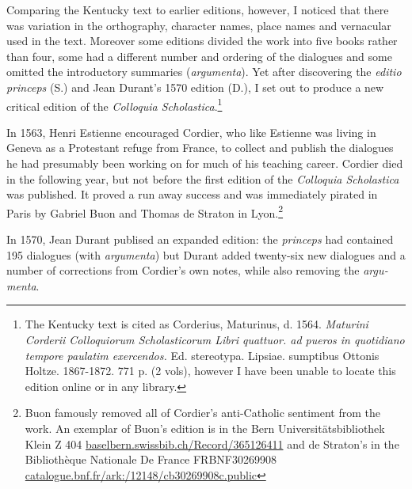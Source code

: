 \documentclass{article}
\begin{document}
\begin{english}
Comparing the Kentucky text to earlier editions, however, I noticed that there was variation in the orthography, character names, place names and vernacular used in the text. Moreover some editions divided the work into five books rather than four, some had a different number and ordering of the dialogues and some omitted the introductory summaries (\emph{argumenta}). Yet after discovering the \emph{editio princeps} (S.) and Jean Durant's 1570 edition (D.), I set out to produce a new critical edition of the \emph{Colloquia Scholastica}.\footnote{The Kentucky text is cited as Corderius, Maturinus, d. 1564. \emph{Maturini Corderii Colloquiorum Scholasticorum Libri quattuor. ad pueros in quotidiano tempore paulatim exercendos.} Ed. stereotypa. Lipsiae. sumptibus Ottonis Holtze. 1867-1872. 771 p. (2 vols), however I have been unable to locate this edition online or in any library.}

In 1563, Henri Estienne encouraged Cordier, who like Estienne was living in Geneva as a Protestant refuge from France, to collect and publish the dialogues he had presumably been working on for much of his teaching career. Cordier died in the following year, but not before the first edition of the \emph{Colloquia Scholastica} was published. It proved a run away success and was immediately pirated in Paris by Gabriel Buon and Thomas de Straton in Lyon.\footnote{Buon famously removed all of Cordier's anti-Catholic sentiment from the work. An exemplar of Buon's edition is in the Bern Universitätsbibliothek Klein Z 404 \url{baselbern.swissbib.ch/Record/365126411} and de Straton's in the Bibliothèque Nationale De France FRBNF30269908 \url{catalogue.bnf.fr/ark:/12148/cb30269908c.public}}

In 1570, Jean Durant publised an expanded edition: the \emph{princeps} had contained 195 dialogues (with \emph{argumenta}) but Durant added twenty-six new dialogues and a number of corrections from Cordier's own notes, while also removing the \emph{argumenta}.


\end{english}
\end{document}
